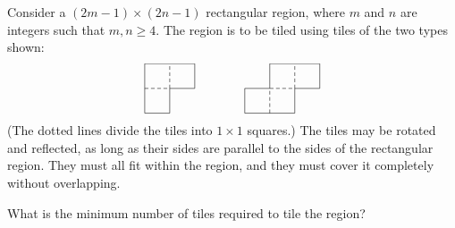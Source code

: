 Consider a $(2m-1)\times(2n-1)$ rectangular region, where $m$ and $n$ are integers such that $m,n\ge 4.$ The region is to be tiled using tiles of the two types shown:
\[
\begin{picture}(140,40)

\put(0,0){\line(0,1){40}}
\put(0,0){\line(1,0){20}}
\put(0,40){\line(1,0){40}}
\put(20,0){\line(0,1){20}}
\put(20,20){\line(1,0){20}}
\put(40,20){\line(0,1){20}}
\multiput(0,20)(5,0){4}{\line(1,0){3}}
\multiput(20,20)(0,5){4}{\line(0,1){3}}

\put(80,0){\line(1,0){40}}
\put(120,0){\line(0,1){20}}
\put(120,20){\line(1,0){20}}
\put(140,20){\line(0,1){20}}
\put(80,0){\line(0,1){20}}
\put(80,20){\line(1,0){20}}
\put(100,20){\line(0,1){20}}
\put(100,40){\line(1,0){40}}
\multiput(100,0)(0,5){4}{\line(0,1){3}}
\multiput(100,20)(5,0){4}{\line(1,0){3}}
\multiput(120,20)(0,5){4}{\line(0,1){3}}

\end{picture}
\](The dotted lines divide the tiles into $1\times 1$ squares.) The tiles may be rotated and reflected, as long as their sides are parallel to the sides of the rectangular region. They must all fit within the region, and they must cover it completely without overlapping.

What is the minimum number of tiles required to tile the region?